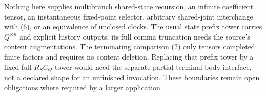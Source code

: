 \documentclass[11pt]{article}
\begin{document}
Nothing here supplies multibranch shared-state recursion, an infinite coefficient tensor, an instantaneous fixed-point selector, arbitrary shared-joint interchange with (6), or an equivalence of unclosed clocks. The usual state prefix tower carries $Q^{\boxtimes n}$ and explicit history outputs; its full comma truncation needs the source's content augmentations. The terminating comparison (2) only tensors completed finite factors and requires no content deletion. Replacing that prefix tower by a fixed full $R_SC_Q$ tower would need the separate partial-terminal-body interface, not a declared shape for an unfinished invocation. These boundaries remain open obligations where required by a larger application.
\end{document}
